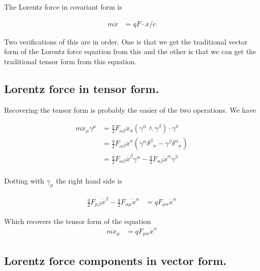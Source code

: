The Lorentz force in covariant form is

%

\begin{align}
m \ddot{x} &= q F \cdot \dot{x}/c
\end{align}

Two verifications of this are in order.  One is that we get the traditional vector form of the Lorentz force equation from
this and the other is that we can get the traditional tensor form from this equation.

\subsection{Lorentz force in tensor form. }

Recovering the tensor form is probably the easier of the two operations.  We have

\begin{align*}
m \ddot{x}_\mu \gamma^\mu
&= \frac{q}{2} F_{\alpha\beta} \dot{x}_\sigma (\gamma^{\alpha} \wedge \gamma^\beta) \cdot \gamma^\sigma \\
&= \frac{q}{2} F_{\alpha\beta} \dot{x}^\sigma (\gamma^{\alpha} {\delta^\beta}_\sigma -\gamma^{\beta} {\delta^\alpha}_\sigma ) \\
&= \frac{q}{2} F_{\alpha\beta} \dot{x}^\beta \gamma^{\alpha} - \frac{q}{2} F_{\alpha\beta} \dot{x}^\alpha \gamma^{\beta} \\
\end{align*}

Dotting with $\gamma_\mu$ the right hand side is

\begin{align*}
\frac{q}{2} F_{\mu\beta} \dot{x}^\beta - \frac{q}{2} F_{\alpha\mu} \dot{x}^\alpha 
&= {q} F_{\mu\alpha} \dot{x}^\alpha 
\end{align*}

Which recovers the tensor form of the equation
\begin{align}
m \ddot{x}_\mu &= {q} F_{\mu\alpha} \dot{x}^\alpha 
\end{align}

\subsection{Lorentz force components in vector form. }

